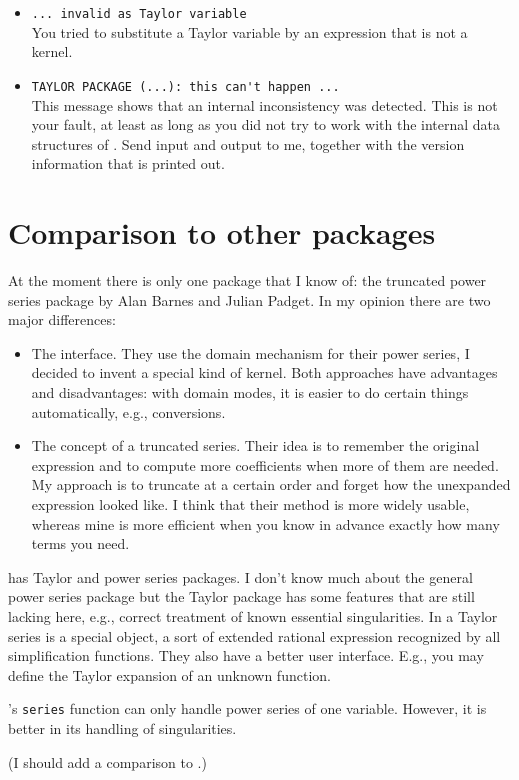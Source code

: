 \begin{itemize}
\item \verb|... invalid as Taylor variable|\\
    You tried to substitute a Taylor variable by an expression that is
    not a kernel.

\item \verb|TAYLOR PACKAGE (...): this can't happen ...|\\
    This message shows that an internal inconsistency was detected.
    This is not your fault, at least as long as you did not try to
    work with the internal data structures of \REDUCE. Send input
    and output to me, together with the version information that is
    printed out.

\end{itemize}

\section{Comparison to other packages}

At the moment there is only one \REDUCE{} package that I know of:
the truncated power series package by Alan Barnes and Julian Padget.
In my opinion there are two major differences:
\begin{itemize}
  \item The interface. They use the domain mechanism for their power
        series, I decided to invent a special kind of kernel. Both
        approaches have advantages and disadvantages: with domain
        modes, it is easier
        to do certain things automatically, e.g., conversions.
  \item The concept of a truncated series. Their idea is to remember
        the original expression and to compute more coefficients when
        more of them are needed. My approach is to truncate at a
        certain order and forget how the unexpanded expression
        looked like.  I think that their method is more widely
        usable, whereas mine is more efficient when you know in
        advance exactly how many terms you need.
\end{itemize}

\MACSYMA{} has Taylor and power series packages.  I don't know much
about the general power series package but the Taylor package has some
features that are still lacking here, e.g., correct treatment of
known essential singularities.  In \MACSYMA{} a Taylor series is a
special object, a sort of extended rational expression recognized by
all simplification functions.  They also have a better user interface. 
E.g., you may define the Taylor expansion of an unknown function. 

\Mathematica's \verb|series| function can only handle power series of
one variable.  However, it is better in its handling of singularities.

(I should add a comparison to \MAPLE.)

